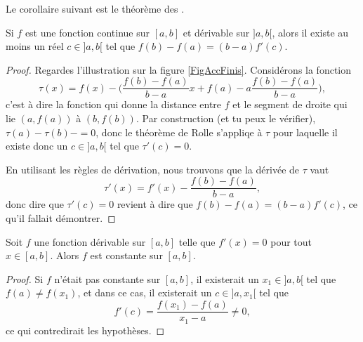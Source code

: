 Le corollaire suivant est le théorème des .

\begin{theorem}		\label{ThoAccFinis}
	Si $f$ est une fonction continue sur $[a,b]$ et dérivable sur $]a,b[$, alors il existe au moins un réel $c\in]a,b[$ tel que $f(b)-f(a)=(b-a)f'(c)$.
\end{theorem}

\newcommand{\CaptionAccfinis}{Illustration du théorème des accroissements finis. Nous avons effectivement qu'au point $c$, la tangente est parallèle au segment qui joint $a$ et $b$.}


\begin{proof}
	Regardes l'illustration sur la figure \ref{FigAccFinis}. Considérons la fonction
	\begin{equation}
		\tau(x)=f(x)-\big( \frac{ f(b)-f(a) }{ b-a }x + f(a) - a\frac{ f(b)-f(a) }{ b-a } \big),
	\end{equation}
	c'est à dire la fonction qui donne la distance entre $f$ et le segment de droite qui lie $(a,f(a))$ à $(b,f(b))$. Par construction (et tu peux le vérifier), $\tau(a)-\tau(b)-=0$, donc le théorème de Rolle s'appliqe à $\tau$ pour laquelle il existe donc un $c\in]a,b[$ tel que $\tau'(c)=0$.

	En utilisant les règles de dérivation, nous trouvons que la dérivée de $\tau$ vaut
	\begin{equation}
		\tau'(x)= f'(x)-\frac{ f(b)-f(a) }{ b-a },
	\end{equation}
	donc dire que $\tau'(c)=0$ revient à dire que $f(b)-f(a)=(b-a)f'(c)$, ce qu'il fallait démontrer.
\end{proof}

\begin{corollary}
Soit $f$ une fonction dérivable sur $[a,b]$ telle que $f'(x) = 0$ pour tout $x \in [a,b]$. Alors $f$ est constante sur $[a,b]$.
\end{corollary}

\begin{proof}
	Si $f$ n'était pas constante sur $[a,b]$, il existerait un $x_1\in ]a,b[$ tel que $f(a)\neq f(x_1)$, et dans ce cas, il existerait un $c\in]a,x_1[$ tel que 
	\begin{equation}
		f'(c)=\frac{ f(x_1)-f(a) }{ x_1-a }\neq 0,
	\end{equation}
	ce qui contredirait les hypothèses.
\end{proof}

